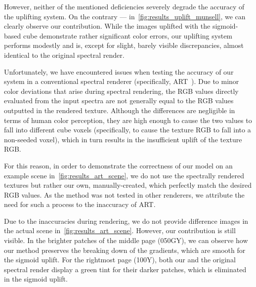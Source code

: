 However, neither of the mentioned deficiencies severely degrade the accuracy of the uplifting system. On the contrary --- in~\cref{fig:results_uplift_munsell}, we can clearly observe our contribution. While the images uplifted with the sigmoid-based cube demonstrate rather significant color errors, our uplifting system performs modestly and is, except for slight, barely visible discrepancies, almost identical to the original spectral render.

Unfortunately, we have encountered issues when testing the accuracy of our system in a conventional spectral renderer (specifically, ART~\cite{ART}). Due to minor color deviations that arise during spectral rendering, the RGB values directly evaluated from the input spectra are not generally equal to the RGB values outputted in the rendered texture. Although the differences are negligible in terms of human color perception, they are high enough to cause the two values to fall into different cube voxels (specifically, to cause the texture RGB to fall into a non-seeded voxel), which in turn results in the insufficient uplift of the texture RGB.

For this reason, in order to demonstrate the correctness of our model on an example scene in~\cref{fig:results_art_scene}, we do not use the spectrally rendered textures but rather our own, manually-created, which perfectly match the desired RGB values. As the method was not tested in other renderers, we attribute the need for such a process to the inaccuracy of ART. 

Due to the inaccuracies during rendering, we do not provide difference images in the actual scene in~\cref{fig:results_art_scene}. However, our contribution is still visible. In the brighter patches of the middle page (050GY), we can observe how our method preserves the breaking down of the gradients, which are smooth for the sigmoid uplift. For the rightmost page (100Y), both our and the original spectral render display a green tint for their darker patches, which is eliminated in the sigmoid uplift.

